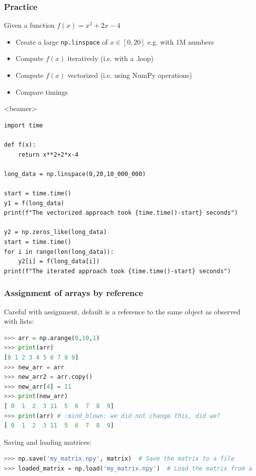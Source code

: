 {\nologo
\begin{frame}[fragile,label=practice_numpy]
  \frametitle{Practice}
  Given a function $\displaystyle  f(x) = x^2+2x-4 $
  \begin{itemize}
   \item Create a large \lstinline|np.linspace| of $x\in[0,20]$ e.g. with 1M numbers
   \item Compute $f(x)$ iteratively (i.e. with a .loop)
   \item Compute $f(x)$ vectorized (i.e. using NumPy operations)
   \item Compare timings
  \end{itemize}
   \pause
   \begin{onlyenv}<beamer> 
    \begin{lstlisting}[basicstyle=\tiny\ttfamily]
import time

def f(x):
    return x**2+2*x-4

long_data = np.linspace(0,20,10_000_000)

start = time.time()
y1 = f(long_data)
print(f"The vectorized approach took {time.time()-start} seconds")

y2 = np.zeros_like(long_data)
start = time.time()
for i in range(len(long_data)):
    y2[i] = f(long_data[i])
print(f"The iterated approach took {time.time()-start} seconds")
    \end{lstlisting}
    \end{onlyenv}
 \end{frame}
}

\begin{frame}[fragile]
  \frametitle{Assignment of arrays by reference}
  Careful with assignment, default is a reference to the same object as observed with lists:
  \begin{lstlisting}[language=Python, numbers=none]
>>> arr = np.arange(0,10,1)
>>> print(arr)
[0 1 2 3 4 5 6 7 8 9]
>>> new_arr = arr 
>>> new_arr2 = arr.copy()
>>> new_arr[4] = 11
>>> print(new_arr)
[ 0  1  2  3 11  5  6  7  8  9]
>>> print(arr) # :mind_blown: we did not change this, did we?
[ 0  1  2  3 11  5  6  7  8  9]
  \end{lstlisting}\pause

  Saving and loading matrices:
  \begin{lstlisting}[language=Python, numbers=none]
>>> np.save('my_matrix.npy', matrix)  # Save the matrix to a file
>>> loaded_matrix = np.load('my_matrix.npy')  # Load the matrix from a file
  \end{lstlisting}
\end{frame}

